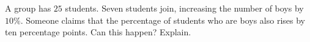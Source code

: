A group has $25$ students. Seven students join, increasing the number of boys by $10\%$. Someone claims that the percentage of students who are boys also rises by ten percentage points. Can this happen? Explain.
